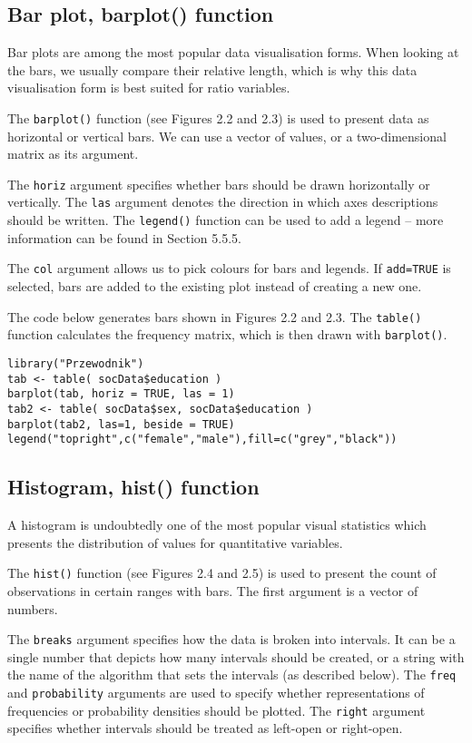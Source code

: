 \documentclass[]{book}
\theoremstyle{definition}
\theoremstyle{definition}
\theoremstyle{definition}
\theoremstyle{remark}
\begin{document}
\subsection{Bar plot, barplot() function}\label{part_241}

Bar plots are among the most popular data visualisation forms. When
looking at the bars, we usually compare their relative length, which is
why this data visualisation form is best suited for ratio variables.

The \texttt{barplot()} function (see Figures 2.2 and 2.3) is used to
present data as horizontal or vertical bars. We can use a vector of
values, or a two-dimensional matrix as its argument.

The \texttt{horiz} argument specifies whether bars should be drawn
horizontally or vertically. The \texttt{las} argument denotes the
direction in which axes descriptions should be written. The
\texttt{legend()} function can be used to add a legend -- more
information can be found in Section 5.5.5.

The \texttt{col} argument allows us to pick colours for bars and
legends. If \texttt{add=TRUE} is selected, bars are added to the
existing plot instead of creating a new one.

The code below generates bars shown in Figures 2.2 and 2.3. The
\texttt{table()} function calculates the frequency matrix, which is then
drawn with \texttt{barplot()}.

\begin{verbatim}
library("Przewodnik")
tab <- table( socData$education )
barplot(tab, horiz = TRUE, las = 1)
tab2 <- table( socData$sex, socData$education )
barplot(tab2, las=1, beside = TRUE)
legend("topright",c("female","male"),fill=c("grey","black"))
\end{verbatim}

\subsection{Histogram, hist() function}\label{part_242}

A histogram is undoubtedly one of the most popular visual statistics
which presents the distribution of values for quantitative variables.

The \texttt{hist()} function (see Figures 2.4 and 2.5) is used to
present the count of observations in certain ranges with bars. The first
argument is a vector of numbers.

The \texttt{breaks} argument specifies how the data is broken into
intervals. It can be a single number that depicts how many intervals
should be created, or a string with the name of the algorithm that sets
the intervals (as described below). The \texttt{freq} and
\texttt{probability} arguments are used to specify whether
representations of frequencies or probability densities should be
plotted. The \texttt{right} argument specifies whether intervals should
be treated as left-open or right-open.
\end{document}
